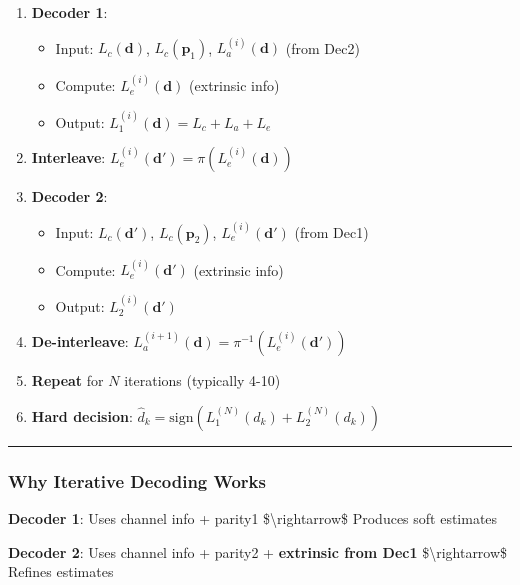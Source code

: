 \begin{enumerate}
\def\labelenumi{\arabic{enumi}.}
\item
  \textbf{Decoder 1}:

  \begin{itemize}
  \tightlist
  \item
    Input: \(L_c(\mathbf{d})\), \(L_c(\mathbf{p}_1)\),
    \(L_a^{(i)}(\mathbf{d})\) (from Dec2)
  \item
    Compute: \(L_e^{(i)}(\mathbf{d})\) (extrinsic info)
  \item
    Output: \(L_1^{(i)}(\mathbf{d}) = L_c + L_a + L_e\)
  \end{itemize}
\item
  \textbf{Interleave}:
  \(L_e^{(i)}(\mathbf{d}') = \pi(L_e^{(i)}(\mathbf{d}))\)
\item
  \textbf{Decoder 2}:

  \begin{itemize}
  \tightlist
  \item
    Input: \(L_c(\mathbf{d}')\), \(L_c(\mathbf{p}_2)\),
    \(L_e^{(i)}(\mathbf{d}')\) (from Dec1)
  \item
    Compute: \(L_e^{(i)}(\mathbf{d}')\) (extrinsic info)
  \item
    Output: \(L_2^{(i)}(\mathbf{d}')\)
  \end{itemize}
\item
  \textbf{De-interleave}:
  \(L_a^{(i+1)}(\mathbf{d}) = \pi^{-1}(L_e^{(i)}(\mathbf{d}'))\)
\item
  \textbf{Repeat} for \(N\) iterations (typically 4-10)
\item
  \textbf{Hard decision}:
  \(\hat{d}_k = \text{sign}(L_1^{(N)}(d_k) + L_2^{(N)}(d_k))\)
\end{enumerate}

\begin{center}\rule{0.5\linewidth}{0.5pt}\end{center}

\subsubsection{Why Iterative Decoding
Works}\label{why-iterative-decoding-works}

\textbf{Decoder 1}: Uses channel info + parity1
\$\textbackslash rightarrow\$ Produces soft estimates

\textbf{Decoder 2}: Uses channel info + parity2 + \textbf{extrinsic from
Dec1} \$\textbackslash rightarrow\$ Refines estimates

